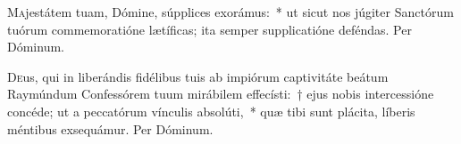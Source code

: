 \documentclass[vesperale_romanum.tex]{subfiles}
\begin{document}
\oratio

\lettrine{M}{a}jestátem tuam, Dómine, súpplices exorámus:~* ut sicut nos júgiter San\-ctórum tuórum commemoratióne lætíficas; ita semper supplicatióne deféndas.
Per Dóminum.

\myrule

\newpage


\duplexmtv

\oratio

\lettrine{D}{e}us, qui in liberándis fidélibus tuis ab impiórum captivitáte beátum Raymúndum Confessórem tuum mirábilem effecísti:~† ejus nobis intercessióne concéde; ut a peccatórum vínculis absolúti,~* quæ tibi sunt plácita, líberis méntibus exsequámur.
Per Dóminum.


\end{document}
